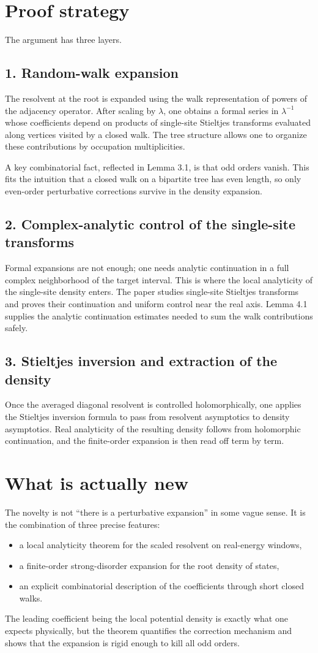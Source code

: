 \documentclass[11pt]{article}
\begin{document}
\section*{Proof strategy}
The argument has three layers.
\subsection*{1. Random-walk expansion}
The resolvent at the root is expanded using the walk representation of powers of the adjacency operator. After scaling by $\lambda$, one obtains a formal series in $\lambda^{-1}$ whose coefficients depend on products of single-site Stieltjes transforms evaluated along vertices visited by a closed walk. The tree structure allows one to organize these contributions by occupation multiplicities.

A key combinatorial fact, reflected in Lemma 3.1, is that odd orders vanish. This fits the intuition that a closed walk on a bipartite tree has even length, so only even-order perturbative corrections survive in the density expansion.
\subsection*{2. Complex-analytic control of the single-site transforms}
Formal expansions are not enough; one needs analytic continuation in a full complex neighborhood of the target interval. This is where the local analyticity of the single-site density enters. The paper studies single-site Stieltjes transforms and proves their continuation and uniform control near the real axis. Lemma 4.1 supplies the analytic continuation estimates needed to sum the walk contributions safely.
\subsection*{3. Stieltjes inversion and extraction of the density}
Once the averaged diagonal resolvent is controlled holomorphically, one applies the Stieltjes inversion formula to pass from resolvent asymptotics to density asymptotics. Real analyticity of the resulting density follows from holomorphic continuation, and the finite-order expansion is then read off term by term.
\section*{What is actually new}
The novelty is not ``there is a perturbative expansion'' in some vague sense. It is the combination of three precise features:
\begin{itemize}[leftmargin=1.5em]
\item a local analyticity theorem for the scaled resolvent on real-energy windows,
\item a finite-order strong-disorder expansion for the root density of states,
\item an explicit combinatorial description of the coefficients through short closed walks.
\end{itemize}
The leading coefficient being the local potential density is exactly what one expects physically, but the theorem quantifies the correction mechanism and shows that the expansion is rigid enough to kill all odd orders.
\end{document}
